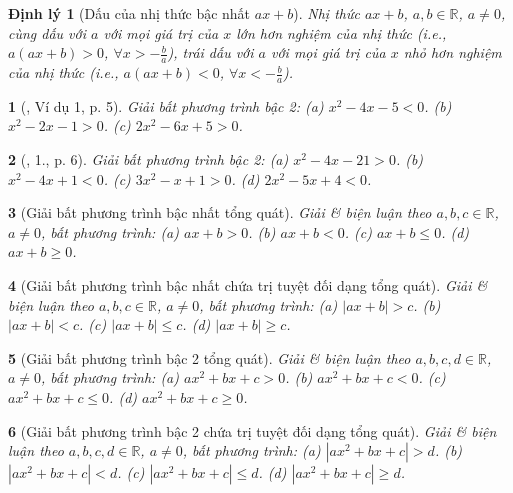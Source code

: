 \documentclass{article}
\newtheorem{baitoan}{}%
\newtheorem{dinhly}{Định lý}
\begin{document}
\begin{dinhly}[Dấu của nhị thức bậc nhất $ax + b$]
	Nhị thức $ax + b$, $a,b\in\mathbb{R}$, $a\ne0$, cùng dấu với $a$ với mọi giá trị của $x$ lớn hơn nghiệm của nhị thức (i.e., $a(ax + b) > 0$, $\forall x > -\frac{b}{a}$), trái dấu với $a$ với mọi giá trị của $x$ nhỏ hơn nghiệm của nhị thức (i.e., $a(ax + b) < 0$, $\forall x < -\frac{b}{a}$).
\end{dinhly}

\begin{baitoan}[\cite{Binh_Toan_9_tap_1}, Ví dụ 1, p. 5]
	Giải bất phương trình bậc 2: (a) $x^2 - 4x - 5 < 0$. (b) $x^2 - 2x - 1 > 0$. (c) $2x^2 - 6x + 5 > 0$.
\end{baitoan}

\begin{baitoan}[\cite{Binh_Toan_9_tap_1}, 1., p. 6]
	Giải bất phương trình bậc 2: (a) $x^2 - 4x - 21 > 0$. (b) $x^2 - 4x + 1 < 0$. (c) $3x^2 - x + 1 > 0$. (d) $2x^2 - 5x + 4 < 0$.
\end{baitoan}

\begin{baitoan}[Giải bất phương trình bậc nhất tổng quát]
	Giải \& biện luận theo $a,b,c\in\mathbb{R}$, $a\ne0$, bất phương trình: (a) $ax + b > 0$. (b) $ax + b < 0$. (c) $ax + b\le0$. (d) $ax + b\ge0$.
\end{baitoan}

\begin{baitoan}[Giải bất phương trình bậc nhất chứa trị tuyệt đối dạng tổng quát]
	Giải \& biện luận theo $a,b,c\in\mathbb{R}$, $a\ne0$, bất phương trình: (a) $|ax + b| > c$. (b) $|ax + b| < c$. (c) $|ax + b|\le c$. (d) $|ax + b|\ge c$.
\end{baitoan}

\begin{baitoan}[Giải bất phương trình bậc 2 tổng quát]
	Giải \& biện luận theo $a,b,c,d\in\mathbb{R}$, $a\ne0$, bất phương trình: (a) $ax^2 + bx + c > 0$. (b) $ax^2 + bx + c < 0$. (c) $ax^2 + bx + c\le0$. (d) $ax^2 + bx + c\ge0$.
\end{baitoan}

\begin{baitoan}[Giải bất phương trình bậc 2 chứa trị tuyệt đối dạng tổng quát]
	Giải \& biện luận theo $a,b,c,d\in\mathbb{R}$, $a\ne0$, bất phương trình: (a) $|ax^2 + bx + c| > d$. (b) $|ax^2 + bx + c| < d$. (c) $|ax^2 + bx + c|\le d$. (d) $|ax^2 + bx + c|\ge d$.
\end{baitoan}
\end{document}
